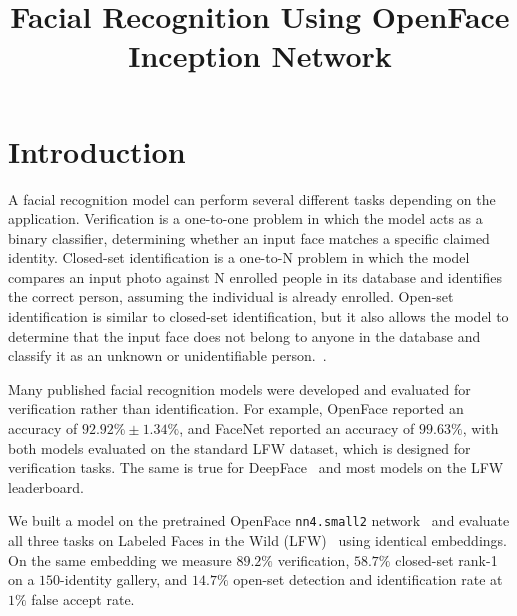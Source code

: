 \documentclass[conference]{IEEEtran}
\begin{document}
\title{Facial Recognition Using OpenFace Inception Network}

\author{
}

\maketitle
\thispagestyle{numbered}   %

\section{Introduction}

A facial recognition model can perform several different tasks depending on the application. Verification is a one-to-one problem in which the model acts as a binary classifier, determining whether an input face matches a specific claimed identity. Closed-set identification is a one-to-N problem in which the model compares an input photo against N enrolled people in its database and identifies the correct person, assuming the individual is already enrolled. Open-set identification is similar to closed-set identification, but it also allows the model to determine that the input face does not belong to anyone in the database and classify it as an unknown or unidentifiable person.~\cite{klare2015ijba}.

Many published facial recognition models were developed and evaluated for verification rather than identification. For example, OpenFace reported an accuracy of
$92.92\% \pm 1.34\%$, and FaceNet reported an accuracy of  $99.63\%$, with both models evaluated on the standard LFW dataset, which is designed for verification tasks.
The same is true for DeepFace~\cite{taigman2014deepface} and most models on the LFW leaderboard.

We built a model on the pretrained OpenFace \texttt{nn4.small2}
network~\cite{amos2016openface} and evaluate all three tasks on Labeled Faces in
the Wild (LFW)~\cite{huang2007lfw} using identical embeddings. On the same
embedding we measure $89.2\%$ verification, $58.7\%$ closed-set rank-1 on a
$150$-identity gallery, and $14.7\%$ open-set detection and identification rate at
$1\%$ false accept rate.
\end{document}
